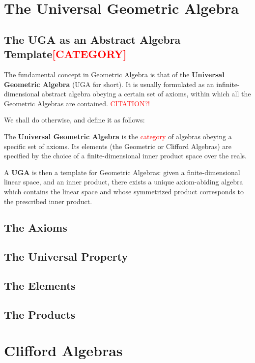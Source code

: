 \section{The Universal Geometric Algebra}
\subsection{The UGA as an Abstract Algebra Template\textcolor{red}{[CATEGORY]}}

The fundamental concept in Geometric Algebra is that of the \textbf{Universal Geometric Algebra} (UGA for short). It is usually formulated as an infinite-dimensional abstract algebra obeying a certain set of axioms, within which all the Geometric Algebras are contained. \textcolor{red}{CITATION?!}

We shall do otherwise, and define it as follows:
\begin{definition}
	The \textbf{Universal Geometric Algebra} is the \textcolor{red}{category} of algebras obeying a specific set of axioms. Its elements (the Geometric or Clifford Algebras) are specified by the choice of a finite-dimensional inner product space over the reals.
\end{definition}

A \textbf{UGA} is then a template for Geometric Algebras: given a finite-dimensional linear space, and an inner product, there exists a unique axiom-abiding algebra which contains the linear space and whose symmetrized product corresponds to the prescribed inner product.

\subsection{The Axioms}

\subsection{The Universal Property}

\subsection{The Elements}

\subsection{The Products}

\section{Clifford Algebras}

